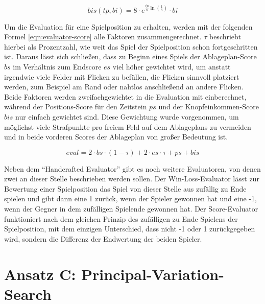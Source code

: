 \begin{equation}
    \label{eqn:button-income-score}
    bis(tp, bi) = 8 \cdot e^{\frac{tp}{8}\ln\left(\frac{1}{8}\right)} \cdot bi
\end{equation}

\pagebreak

Um die Evaluation für eine Spielposition zu erhalten, werden mit der folgenden Formel \ref{eqn:evaluator-score} alle Faktoren zusammengerechnet. $\tau$ beschriebt hierbei als Prozentzahl, wie weit das Spiel der Spielposition schon fortgeschritten ist. Daraus lässt sich schließen, dass zu Beginn eines Spiels der Ablageplan-Score $bs$ im Verhältnis zum Endscore $es$ viel höher gewichtet wird, um anstatt irgendwie viele Felder mit Flicken zu befüllen, die Flicken sinnvoll platziert werden, zum Beispiel am Rand oder nahtlos anschließend an andere Flicken. Beide Faktoren werden zweifachgewichtet in die Evaluation mit einberechnet, während der Positions-Score für den Zeitstein $ps$ und der Knopfeinkommen-Score $bis$ nur einfach gewichtet sind. Diese Gewichtung wurde vorgenommen, um möglichst viele Strafpunkte pro freiem Feld auf dem Ablageplans zu vermeiden und in beide vorderen Scores der Ablageplan von großer Bedeutung ist.

\begin{equation}
    \label{eqn:evaluator-score}
    eval = 2 \cdot bs \cdot (1 - \tau) + 2 \cdot es \cdot \tau + ps + bis
\end{equation}

Neben dem \enquote{Handcrafted Evaluator} gibt es noch weitere Evaluatoren, von denen zwei an dieser Stelle beschrieben werden sollen. Der Win-Loss-Evaluator lässt zur Bewertung einer Spielposition das Spiel von dieser Stelle aus zufällig zu Ende spielen und gibt dann eine 1 zurück, wenn der Spieler gewonnen hat und eine -1, wenn der Gegner in dem zufälligen Spielende gewonnen hat. Der Score-Evaluator funktioniert nach dem gleichen Prinzip des zufälligen zu Ende Spielens der Spielposition, mit dem einzigen Unterschied, dass nicht -1 oder 1 zurückgegeben wird, sondern die Differenz der Endwertung der beiden Spieler.

\pagebreak

\section{Ansatz C: Principal-Variation-Search}
\label{section:erstellung-ansatz-b}

